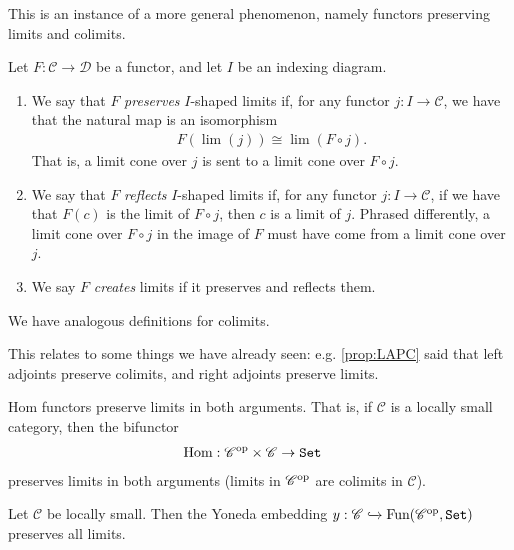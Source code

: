 This is an instance of a more general phenomenon, namely functors preserving limits and colimits.

\begin{definition}\label{def:preserve-reflect-create-limits} Let $F:\mathscr{C} \to \mathscr{D}$ be a functor, and let $I$ be an indexing diagram.
\begin{enumerate}
    \item We say that $F$ \textit{preserves} $I$-shaped limits if, for any functor $j: I \to \mathscr{C}$, we have that the natural map is an isomorphism
    \begin{align*}
        F(\lim(j)) \cong \lim(F\circ j).
    \end{align*}
    That is, a limit cone over $j$ is sent to a limit cone over $F\circ j$.

    \item We say that $F$ \textit{reflects} $I$-shaped limits if, for any functor $j: I \to \mathscr{C}$, if we have that $F(c)$ is the limit of $F\circ j$, then $c$ is a limit of $j$. Phrased differently, a limit cone over $F\circ j$ in the image of $F$ must have come from a limit cone over $j$.

    \item We say $F$ \textit{creates} limits if it preserves and reflects them.
\end{enumerate}
We have analogous definitions for colimits.
\end{definition}

This relates to some things we have already seen: e.g. \autoref{prop:LAPC} said that left adjoints preserve colimits, and right adjoints preserve limits.

\begin{proposition}\label{prop:hom-functors-preserve-limits} Hom functors preserve limits in both arguments. That is, if $\mathscr{C}$ is a locally small category, then the bifunctor
\begin{align*}
    \textup{Hom} : \mathscr{C}^{\text{op}} \times \mathscr{C} &\to \texttt{Set}
\end{align*}
preserves limits in both arguments (limits in $\mathscr{C}^{\text{op}}$ are colimits in $\mathscr{C}$).
\end{proposition}


\begin{corollary}\label{cor:Yoneda-embedding-preserves-limits} Let $\mathscr{C}$ be locally small. Then the Yoneda embedding $y: \mathscr{C} \xhookrightarrow{} \text{Fun}(\mathscr{C}^{\text{op}}, \texttt{Set})$ preserves all limits.
\end{corollary}


